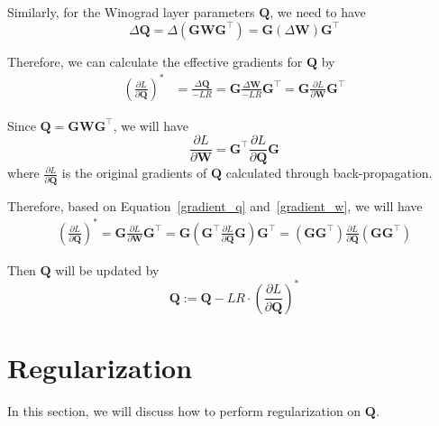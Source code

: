 \documentclass[12pt]{article} %
\begin{document}
Similarly, for the Winograd layer parameters $\boldsymbol{Q}$, we need to have
\begin{equation}
	\Delta{\boldsymbol{Q}} = \Delta(\boldsymbol{G} \boldsymbol{W} \boldsymbol{G}^{\top}) = \boldsymbol{G} (\Delta\boldsymbol{W}) \boldsymbol{G}^{\top}
\end{equation}

Therefore, we can calculate the effective gradients for $\boldsymbol{Q}$ by
\begin{equation}
\label{gradient_q}
\begin{aligned}
	(\frac{\partial L}{\partial \boldsymbol{Q}})^*
		&= \frac{\Delta{\boldsymbol{Q}}}{-LR} = \boldsymbol{G} \frac{\Delta\boldsymbol{W}}{-LR} \boldsymbol{G}^{\top}
		= \boldsymbol{G} \frac{\partial L}{\partial \boldsymbol{W}} \boldsymbol{G}^{\top}
\end{aligned}
\end{equation}

Since $\boldsymbol{Q} = \boldsymbol{G} \boldsymbol{W} \boldsymbol{G}^{\top}$, we will have
\begin{equation}
\label{gradient_w}
	\frac{\partial L}{\partial \boldsymbol{W}} = \boldsymbol{G}^{\top} \frac{\partial L}{\partial \boldsymbol{Q}} \boldsymbol{G}
\end{equation}
where $\frac{\partial L}{\partial \boldsymbol{Q}}$ is the original gradients of $\boldsymbol{Q}$ calculated through back-propagation.

Therefore, based on Equation~\ref{gradient_q} and~\ref{gradient_w}, we will have
\begin{equation}
\label{effective_grad}
\begin{aligned}
	(\frac{\partial L}{\partial \boldsymbol{Q}})^*
		= \boldsymbol{G} \frac{\partial L}{\partial \boldsymbol{W}} \boldsymbol{G}^{\top}
		= \boldsymbol{G} (\boldsymbol{G}^{\top} \frac{\partial L}{\partial \boldsymbol{Q}} \boldsymbol{G}) \boldsymbol{G}^{\top}
		= (\boldsymbol{G} \boldsymbol{G}^{\top})\frac{\partial L}{\partial \boldsymbol{Q}}(\boldsymbol{G} \boldsymbol{G}^{\top})
\end{aligned}
\end{equation}

Then $\boldsymbol{Q}$ will be updated by
\begin{equation}
	\boldsymbol{Q} := \boldsymbol{Q} - LR \cdot (\frac{\partial L}{\partial \boldsymbol{Q}})^*
\end{equation}

\section{Regularization}
In this section, we will discuss how to perform regularization on $\boldsymbol{Q}$.
\end{document}

